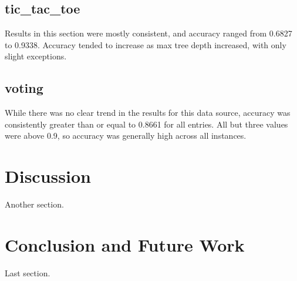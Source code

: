 \documentclass{sig-alternate}
\begin{document}
\subsection{tic\_tac\_toe}
Results in this section were mostly consistent, and accuracy ranged from 0.6827 to 0.9338. Accuracy tended to increase as max tree depth increased, with only slight exceptions.
\subsection{voting}
While there was no clear trend in the results for this data source, accuracy was consistently greater than or equal to 0.8661 for all entries. All but three values were above 0.9, so accuracy was generally high across all instances.

\section{Discussion}
Another section.

\section{Conclusion and Future Work}
Last section.

%

%
\end{document}
